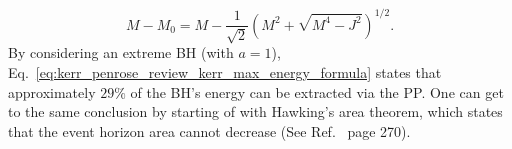%
\begin{equation}
  M - M_0 = M - \frac{1}{\sqrt{2}}\left( M^2 + \sqrt{M^4 - J^2} \right)^{1/2}.
  \label{eq:kerr_penrose_review_kerr_max_energy_formula}
\end{equation}
%
By considering an extreme \ac{BH} (with $a=1$), Eq.~\eqref{eq:kerr_penrose_review_kerr_max_energy_formula} states that approximately $29\%$ of the \ac{BH}'s energy can be extracted via the \ac{PP}. One can get to the same conclusion by starting of with Hawking's area theorem, which states that the event horizon area cannot decrease (See Ref.~\cite{carroll} page 270).
